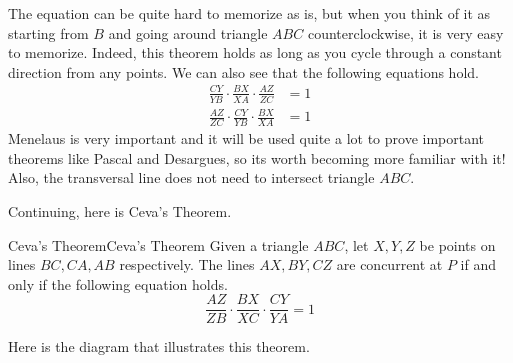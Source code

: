 \documentclass[../../../main.tex]{subfiles}
\begin{document}
The equation can be quite hard to memorize as is, but when you think
of it as starting from $B$ and going around triangle $ABC$
counterclockwise, it is very easy to memorize. Indeed, this theorem
holds as long as you cycle through a constant direction from any
points. We can also see that the following equations hold.
\begin{align*}
    \frac{CY}{YB} \cdot \frac{BX}{XA} \cdot \frac{AZ}{ZC} &= 1 \\
    \frac{AZ}{ZC} \cdot \frac{CY}{YB} \cdot \frac{BX}{XA} &= 1
\end{align*}
Menelaus is very important and it will be used quite a lot to prove
important theorems like Pascal and Desargues, so its worth becoming
more familiar with it! Also, the transversal line does not need to
intersect triangle $ABC$.

Continuing, here is Ceva's Theorem.

\begin{theorem}{Ceva's Theorem}{Ceva's Theorem}
Given a triangle $ABC$, let $X, Y, Z$ be points on lines $BC, CA, AB$
respectively. The lines $AX, BY, CZ$ are concurrent at $P$ if and
only if the following equation holds.
\[
\frac{AZ}{ZB} \cdot \frac{BX}{XC} \cdot \frac{CY}{YA} = 1
\]
\end{theorem}

Here is the diagram that illustrates this theorem.

\begin{figure}[H]
\centering
{}
\end{figure}
\end{document}
